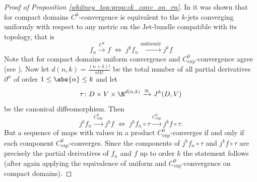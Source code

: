 \begin{proof}[Proof of Proposition \ref{whitney_top:prop:ck_conv_on_rn}]
    In \cite{golubitsky2012stable} it was shown that for compact domains $C^k$-convergence is equivalent to the $k$-jets converging uniformly with respect to any metric on the Jet-bundle compatible with its topology, that is 
    \[
    f_n \xrightarrow{C^k} f \; \Leftrightarrow \; j^kf_n \xrightarrow{\mathrm{uniformly}} j^kf
    \]
    Note that for compact domains uniform convergence and $C^0_\mathrm{exp}$-convergence agree (see \cite{steimle_topo}). Now let $d(n,k) = \frac{(n+k)!}{n!k!}$ be the total number of all partial derivatives $\partial^\alpha$ of order $1 \leq \abs{\alpha} \leq k$ and let 
    \[
    \tau \colon D \times V \times \R^{d(n,k)} \xrightarrow{\cong} J^k(D,V)
    \]
    be the canonical diffeomorphism. Then 
    \[
    j^kf_n \xrightarrow{C^0_\mathrm{exp}} j^kf \; \Leftrightarrow \; j^kf_n \circ \tau \xrightarrow{C^0_\mathrm{exp}} j^kf \circ \tau.
    \]
    But a sequence of maps with values in a product $C^0_\mathrm{exp}$-converges if and only if each component $C^0_\mathrm{exp}$-converges. Since the components of $j^kf_n \circ \tau$ and $j^kf \circ \tau$ are precisely the partial derivatives of $f_n$ and $f$ up to order $k$ the statement follows (after again applying the equivalence of uniform and $C^0_\mathrm{exp}$-convergence on compact domains).
\end{proof}

